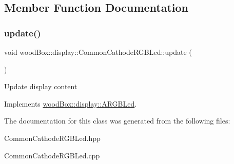 \subsection{Member Function Documentation}
\mbox{\label{classwood_box_1_1display_1_1_common_cathode_r_g_b_led_a597c7ae002c7f94431ccaafd160a857a}} 
\subsubsection{\texorpdfstring{update()}{update()}}
{\footnotesize\ttfamily void wood\+Box\+::display\+::\+Common\+Cathode\+R\+G\+B\+Led\+::update (\begin{DoxyParamCaption}{ }\end{DoxyParamCaption})\hspace{0.3cm}{\ttfamily [virtual]}}

Update display content 

Implements \mbox{\hyperlink{classwood_box_1_1display_1_1_a_r_g_b_led_ab71f321d91e931f95b96d1f492a9454d}{wood\+Box\+::display\+::\+A\+R\+G\+B\+Led}}.



The documentation for this class was generated from the following files\+:\begin{DoxyCompactItemize}
\item 
Common\+Cathode\+R\+G\+B\+Led.\+hpp\item 
Common\+Cathode\+R\+G\+B\+Led.\+cpp\end{DoxyCompactItemize}
